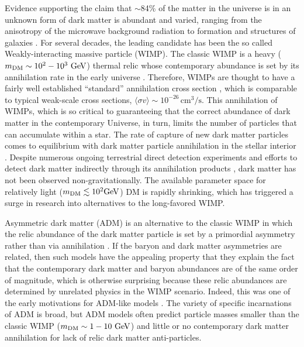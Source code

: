 \documentclass[useAMS,usenatbib]{mnras}
\begin{document}
  Evidence supporting the claim that $\sim$84\% of the matter in the universe is in 
  an unknown form of dark matter is abundant and varied, ranging from the 
  anisotropy of the microwave background radiation to formation and structures of galaxies 
  \citep[e.g.,][]{jungman_etal96,Bertone+05,PLanck18}. 
  For several decades, the leading candidate has been the so called 
  Weakly-interacting massive particle (WIMP). 
  The classic WIMP is a heavy ($m_{\mathrm{DM}} \sim 10^2-10^3 \ \mathrm{GeV}$) 
  thermal relic whose contemporary abundance is set 
  by its annihilation rate in the early universe 
  \cite[e.g.,][]{kolb_turner90}. 
  Therefore, WIMPs are thought to have a fairly well established ``standard'' annihilation 
  cross section \citep[e.g.,][]{steigman_etal12}, which is comparable to typical weak-scale 
  cross sections, $\langle \sigma v \rangle \sim 10^{-26} \, \mathrm{cm}^3/\mathrm{s}$. 
  This annihilation of WIMPs, which is so critical to guaranteeing that the 
  correct abundance of dark matter in the contemporary Universe, in turn, 
  limits the number of particles that can accumulate within a star. 
  The rate of capture of new dark matter particles 
  comes to equilibrium with dark matter particle annihilation in the 
  stellar interior \citep{krauss_etal85}. 
  Despite numerous ongoing terrestrial direct detection experiments 
  \citep[see][for a review]{Schumann19} 
  and efforts to detect dark matter indirectly through 
  its annihilation products \citep[reviewed in][]{Slatyer17}, 
  dark matter has not been observed non-gravitationally. The 
  available parameter space for relatively light ($m_{\mathrm{DM}} \lesssim 10^2 \mathrm{GeV}$) DM
  is rapidly shrinking, which has triggered a surge in research into 
  alternatives to the long-favored WIMP.
  

  Asymmetric dark matter (ADM) is an alternative to the classic WIMP in which 
  the relic abundance of the dark matter particle is set by a primordial asymmetry 
  rather than via annihilation \citep[for a review, see][and references therein]{adm_review}. 
  If the baryon and dark matter asymmetries are 
  related, then such models have the appealing property that they explain 
  the fact that the contemporary dark matter and baryon abundances are 
  of the same order of magnitude, which is otherwise surprising because 
  these relic abundances are determined by unrelated physics in the WIMP 
  scenario. Indeed, this was one of the early motivations for ADM-like 
  models \citep[e.g.,][]{Nussinov85,barr_etal90,chivukula_walker90,kaplan92}. 
  The variety of specific incarnations of ADM is broad, 
  but ADM models often predict particle masses smaller than 
  the classic WIMP ($m_{\mathrm{DM}} \sim 1-10 \ \mathrm{GeV}$) and little or no 
  contemporary dark matter annihilation for lack of relic 
  dark matter anti-particles. 
  
\end{document}

